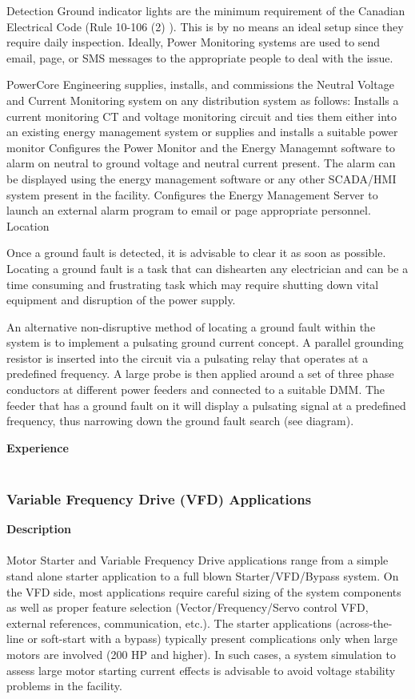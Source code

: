 Detection 
Ground indicator lights are the minimum requirement of the Canadian Electrical Code (Rule 10-106 (2) ). This is by no means an ideal setup since they require daily inspection. Ideally, Power Monitoring systems are used to send email, page, or SMS messages to the appropriate people to deal with the issue. 

PowerCore Engineering supplies, installs, and commissions the Neutral Voltage and Current Monitoring system on any distribution system as follows: 
Installs a current monitoring CT and voltage monitoring circuit and ties them either into an existing energy management system or supplies and installs a suitable power monitor
Configures the Power Monitor and the Energy Managemnt software to alarm on neutral to ground voltage and neutral current present. The alarm can be displayed using the energy management software or any other SCADA/HMI system present in the facility.
Configures the Energy Management Server to launch an external alarm program to email or page appropriate personnel.
Location 

Once a ground fault is detected, it is advisable to clear it as soon as possible. Locating a ground fault is a task that can dishearten any electrician and can be a time consuming and frustrating task which may require shutting down vital equipment and disruption of the power supply. 

An alternative non-disruptive method of locating a ground fault within the system is to implement a pulsating ground current concept. 
A parallel grounding resistor is inserted into the circuit via a pulsating relay that operates at a predefined frequency.
A large probe is then applied around a set of three phase conductors at different power feeders and connected to a suitable DMM.
The feeder that has a ground fault on it will display a pulsating signal at a predefined frequency, thus narrowing down the ground fault search (see diagram).

\textbf{Experience}\\
\\	

\subsubsection{Variable Frequency Drive (VFD) Applications}
\label{Sub:Exp:VFD}

\textbf{Description}\\
\\
Motor Starter and Variable Frequency Drive applications range from a simple stand alone starter application to a full blown Starter/VFD/Bypass system. On the VFD side, most applications require careful sizing of the system components as well as proper feature selection (Vector/Frequency/Servo control VFD, external references, communication, etc.). The starter applications (across-the-line or soft-start with a bypass) typically present complications only when large motors are involved (200 HP and higher). In such cases, a system simulation to assess large motor starting current effects is advisable to avoid voltage stability problems in the facility. 

